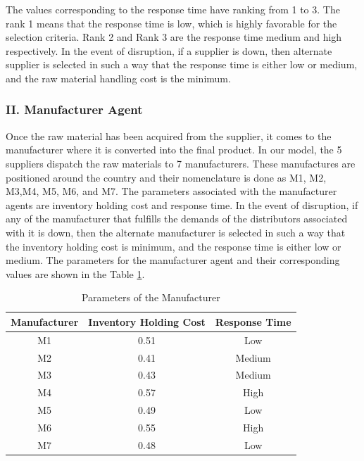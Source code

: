 The values corresponding to the response time have ranking from 1 to 3. The rank 1 means that the response time is low, which is highly favorable for the selection criteria. Rank 2 and Rank 3 are the response time medium and high respectively. In the event of disruption, if a supplier is down, then alternate supplier is selected in such a way that the response time is either low or medium, and the raw material handling cost is the minimum.

\subsubsection{II. Manufacturer Agent}

Once the raw material has been acquired from the supplier, it comes to the manufacturer where it is converted into the final product. In our model, the 5 suppliers dispatch the raw materials to 7 manufacturers. These manufactures are positioned around the country and their nomenclature is done as M1, M2, M3,M4, M5, M6, and M7. The parameters associated with the manufacturer agents are inventory holding cost and response time. In the event of disruption, if any of the manufacturer that fulfills the demands of the distributors associated with it is down, then the alternate manufacturer is selected in such a way that the inventory holding cost is minimum, and the response time is either low or medium. The parameters for the manufacturer agent and their corresponding values are shown in the Table \ref{tab:Manufacturer}.


\begin{table}[H]
\caption{Parameters of the Manufacturer}
\label{tab:Manufacturer}
\begin{center}
\begin{tabular}[b]{|c|c|c|}
	\hline
	Manufacturer & Inventory Holding Cost & Response Time \\ \hline
	M1 & 0.51 & Low\\ \hline
	M2 & 0.41 & Medium \\ \hline
	M3 & 0.43 & Medium \\ \hline
	M4 & 0.57 & High \\ \hline
	M5 & 0.49 & Low \\ \hline
	M6 & 0.55 & High \\ \hline
	M7 & 0.48 & Low \\ \hline
\end{tabular}
\end{center}
\end{table}

